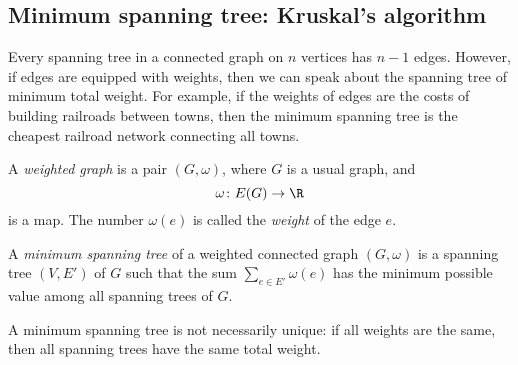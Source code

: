 \begin{page}

\subsection{Minimum spanning tree: Kruskal's algorithm}
Every spanning tree in a connected graph on $n$ vertices has $n-1$ edges.
However, if edges are equipped with weights, then we can speak about the spanning tree of minimum total weight.
For example, if the weights of edges are the costs of building railroads between towns,
then the minimum spanning tree is the cheapest railroad network connecting all towns.


\end{page}

\begin{page}

\begin{dfn}
A \emph{weighted graph} is a pair $(G, \omega)$, where $G$ is a usual graph, and
\[
\omega \colon E(G) \to \R
\]
is a map. The number $\omega(e)$ is called the \emph{weight} of the edge $e$.
\end{dfn}

\end{page}

\begin{page}

\begin{dfn}
A \emph{minimum spanning tree} of a weighted connected graph $(G, \omega)$ is a spanning tree $(V, E')$ of $G$ such that
the sum $\sum_{e \in E'} \omega(e)$ has the minimum possible value among all spanning trees of $G$.
\end{dfn}

\end{page}

\begin{page}

A minimum spanning tree is not necessarily unique: if all weights are the same, then all spanning trees have the same total weight.


\end{page}

